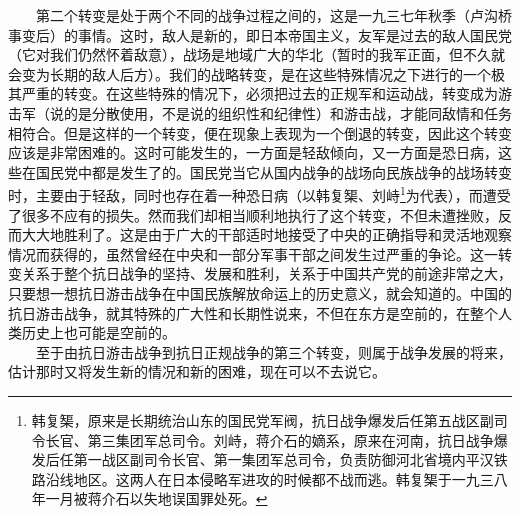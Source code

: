 \documentclass[cn,11pt,chinese]{elegantbook}
\begin{document}
　　第二个转变是处于两个不同的战争过程之间的，这是一九三七年秋季（卢沟桥事变后）的事情。这时，敌人是新的，即日本帝国主义，友军是过去的敌人国民党（它对我们仍然怀着敌意），战场是地域广大的华北（暂时的我军正面，但不久就会变为长期的敌人后方）。我们的战略转变，是在这些特殊情况之下进行的一个极其严重的转变。在这些特殊的情况下，必须把过去的正规军和运动战，转变成为游击军（说的是分散使用，不是说的组织性和纪律性）和游击战，才能同敌情和任务相符合。但是这样的一个转变，便在现象上表现为一个倒退的转变，因此这个转变应该是非常困难的。这时可能发生的，一方面是轻敌倾向，又一方面是恐日病，这些在国民党中都是发生了的。国民党当它从国内战争的战场向民族战争的战场转变时，主要由于轻敌，同时也存在着一种恐日病（以韩复榘、刘峙\footnote[26]{ 韩复榘，原来是长期统治山东的国民党军阀，抗日战争爆发后任第五战区副司令长官、第三集团军总司令。刘峙，蒋介石的嫡系，原来在河南，抗日战争爆发后任第一战区副司令长官、第一集团军总司令，负责防御河北省境内平汉铁路沿线地区。这两人在日本侵略军进攻的时候都不战而逃。韩复榘于一九三八年一月被蒋介石以失地误国罪处死。}为代表），而遭受了很多不应有的损失。然而我们却相当顺利地执行了这个转变，不但未遭挫败，反而大大地胜利了。这是由于广大的干部适时地接受了中央的正确指导和灵活地观察情况而获得的，虽然曾经在中央和一部分军事干部之间发生过严重的争论。这一转变关系于整个抗日战争的坚持、发展和胜利，关系于中国共产党的前途非常之大，只要想一想抗日游击战争在中国民族解放命运上的历史意义，就会知道的。中国的抗日游击战争，就其特殊的广大性和长期性说来，不但在东方是空前的，在整个人类历史上也可能是空前的。\\
　　至于由抗日游击战争到抗日正规战争的第三个转变，则属于战争发展的将来，估计那时又将发生新的情况和新的困难，现在可以不去说它。\\
\end{document}
